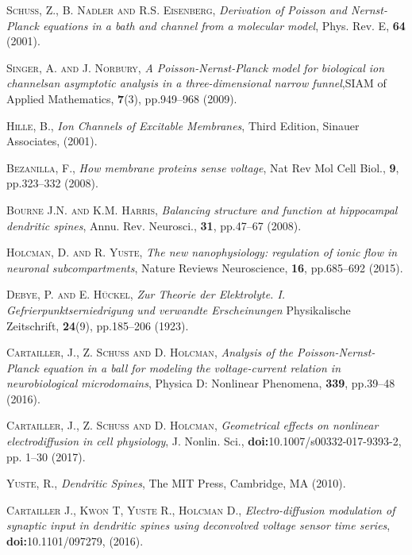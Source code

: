 \documentclass[12pt]{article}
\newcommand{\SC}{\textsc}
\begin{document}
{%
%
%
%
%
%
\newpage

\begin{thebibliography}{99}
\SC{Schuss, Z., B. Nadler and R.S. Eisenberg},
{\it Derivation of Poisson and Nernst-Planck equations in a bath and channel from a molecular model}, {Phys. Rev. E}, \textbf{64} (2001).

\SC{Singer, A. and J. Norbury},
{\it A Poisson-Nernst-Planck model for biological ion channelsan asymptotic analysis in a three-dimensional narrow funnel},{SIAM of Applied Mathematics}, {\bf 7}(3), pp.949--968 (2009).

 \SC{Hille, B.}, {\it Ion Channels of Excitable Membranes}, {Third Edition, Sinauer Associates}, (2001).
  		
\SC{Bezanilla, F.},
{\it How membrane proteins sense voltage}, {Nat Rev Mol Cell Biol.}, \textbf{9}, pp.323--332 (2008).	
	

\SC{Bourne J.N. and K.M. Harris}, {\it Balancing structure and function at hippocampal dendritic spines}, Annu. Rev. Neurosci., \textbf{31}, pp.47--67 (2008).	

\SC{Holcman, D. and R. Yuste},
{\it The new nanophysiology: regulation of ionic flow in neuronal subcompartments},
{Nature Reviews Neuroscience}, \textbf{16}, pp.685--692 (2015).
	
\SC{Debye, P.  and E. H\"uckel}, {\it Zur Theorie der Elektrolyte. I. Gefrierpunktserniedrigung und verwandte Erscheinungen} Physikalische Zeitschrift, \textbf{24}(9), pp.185--206  (1923).

\SC{Cartailler, J., Z. Schuss  and D. Holcman},
{\it Analysis of the Poisson-Nernst-Planck equation in a ball for modeling the voltage-current relation in neurobiological microdomains}, {Physica D: Nonlinear Phenomena,} \textbf{339}, pp.39--48 (2016).

\SC{Cartailler, J., Z. Schuss  and D. Holcman}, {\it Geometrical effects on nonlinear electrodiffusion in cell physiology}, J. Nonlin. Sci., {\bf doi:}10.1007/s00332-017-9393-2, pp. 1--30 (2017).
	
\SC{Yuste, R.}, {\it Dendritic Spines}, {The MIT Press, Cambridge, MA} (2010).	

 \SC{Cartailler J., Kwon T, Yuste R., Holcman D.},
{\it Electro-diffusion modulation of synaptic input in dendritic spines using deconvolved voltage sensor time series}, {\bf doi:}10.1101/097279, (2016).


\end{thebibliography}}
\end{document}
